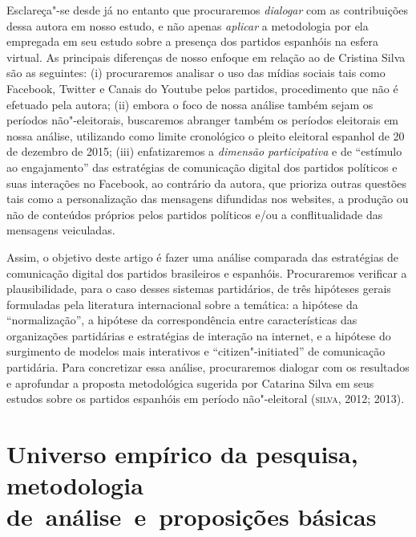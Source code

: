Esclareça"-se desde já no entanto que procuraremos \emph{dialogar} com as
contribuições dessa autora em nosso estudo, e não apenas \emph{aplicar}
a metodologia por ela empregada em seu estudo sobre a presença dos
partidos espanhóis na esfera virtual. As principais diferenças de nosso
enfoque em relação ao de Cristina Silva são as seguintes: (i)
procuraremos analisar o uso das mídias sociais tais como Facebook,
Twitter e Canais do Youtube pelos partidos, procedimento que não é
efetuado pela autora; (ii) embora o foco de nossa análise também sejam
os períodos não"-eleitorais, buscaremos abranger também os períodos
eleitorais em nossa análise, utilizando como limite cronológico o pleito
eleitoral espanhol de 20 de dezembro de 2015; (iii) enfatizaremos a
\emph{dimensão participativa} e de ``estímulo ao engajamento'' das
estratégias de comunicação digital dos partidos políticos e suas
interações no Facebook, ao contrário da autora, que prioriza outras
questões tais como a personalização das mensagens difundidas nos
websites, a produção ou não de conteúdos próprios pelos partidos
políticos e/ou a conflitualidade das mensagens veiculadas.

Assim, o objetivo deste artigo é fazer uma análise comparada das
estratégias de comunicação digital dos partidos brasileiros e espanhóis.
Procuraremos verificar a plausibilidade, para o caso desses sistemas
partidários, de três hipóteses gerais formuladas pela literatura
internacional sobre a temática: a hipótese da ``normalização'', a
hipótese da correspondência entre características das organizações
partidárias e estratégias de interação na internet, e a hipótese do
surgimento de modelos mais interativos e ``citizen"-initiated'' de
comunicação partidária. Para concretizar essa análise, procuraremos
dialogar com os resultados e aprofundar a proposta metodológica sugerida
por Catarina Silva em seus estudos sobre os partidos espanhóis em
período não"-eleitoral (\textsc{silva}, 2012; 2013).

\section{Universo empírico da pesquisa, metodologia de~análise~e~proposições básicas}

